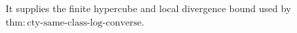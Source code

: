It supplies the finite hypercube and local divergence bound used by \(\mathrm{thm:cty\text{-}same\text{-}class\text{-}log\text{-}converse}\).